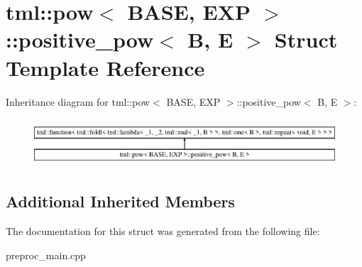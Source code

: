 \hypertarget{structtml_1_1pow_1_1positive__pow}{\section{tml\+:\+:pow$<$ B\+A\+S\+E, E\+X\+P $>$\+:\+:positive\+\_\+pow$<$ B, E $>$ Struct Template Reference}
\label{structtml_1_1pow_1_1positive__pow}
}
Inheritance diagram for tml\+:\+:pow$<$ B\+A\+S\+E, E\+X\+P $>$\+:\+:positive\+\_\+pow$<$ B, E $>$\+:\begin{figure}[H]
\begin{center}
\leavevmode
\includegraphics[height=1.809370cm]{structtml_1_1pow_1_1positive__pow}
\end{center}
\end{figure}
\subsection*{Additional Inherited Members}


The documentation for this struct was generated from the following file\+:\begin{DoxyCompactItemize}
\item 
preproc\+\_\+main.\+cpp\end{DoxyCompactItemize}
